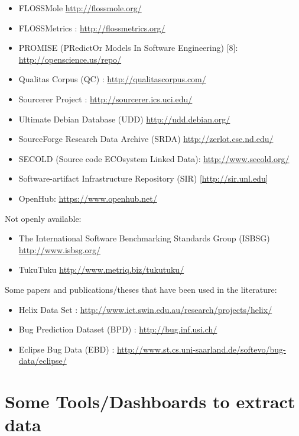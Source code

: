\documentclass[]{book}
\theoremstyle{definition}
\theoremstyle{definition}
\theoremstyle{remark}
\begin{document}
\begin{itemize}
\item
  FLOSSMole \citep{HCC06} \url{http://flossmole.org/}
\item
  FLOSSMetrics \citep{herraiz2009flossmetrics}:
  \url{http://flossmetrics.org/}
\item
  PROMISE (PRedictOr Models In Software Engineering) {[}8{]}:
  \url{http://openscience.us/repo/}
\item
  Qualitas Corpus (QC) \citep{QualitasCorpus2010}:
  \url{http://qualitascorpus.com/}
\item
  Sourcerer Project \citep{LBNRB09}: \url{http://sourcerer.ics.uci.edu/}
\item
  Ultimate Debian Database (UDD) \citep{NZ10}
  \url{http://udd.debian.org/}
\item
  SourceForge Research Data Archive (SRDA) \citep{VanAntwerpM2008}
  \url{http://zerlot.cse.nd.edu/}
\item
  SECOLD (Source code ECOsystem Linked Data):
  \url{http://www.secold.org/}
\item
  Software-artifact Infrastructure Repository (SIR)
  {[}\url{http://sir.unl.edu}{]}
\item
  OpenHub: \url{https://www.openhub.net/}
\end{itemize}

Not openly available:

\begin{itemize}
\item
  The International Software Benchmarking Standards Group (ISBSG)
  \url{http://www.isbsg.org/}
\item
  TukuTuku \url{http://www.metriq.biz/tukutuku/}
\end{itemize}

Some papers and publications/theses that have been used in the
literature:

\begin{itemize}
\item
  Helix Data Set \citep{Vasa2010}:
  \url{http://www.ict.swin.edu.au/research/projects/helix/}
\item
  Bug Prediction Dataset (BPD) \citep[\citet{ALR11}]{DAmb2010a}:
  \url{http://bug.inf.usi.ch/}
\item
  Eclipse Bug Data (EBD) \citep[\citet{NZZH12}]{ZPZ07}:
  \url{http://www.st.cs.uni-saarland.de/softevo/bug-data/eclipse/}
\end{itemize}

\section{Some Tools/Dashboards to extract
data}\label{some-toolsdashboards-to-extract-data}
\end{document}
